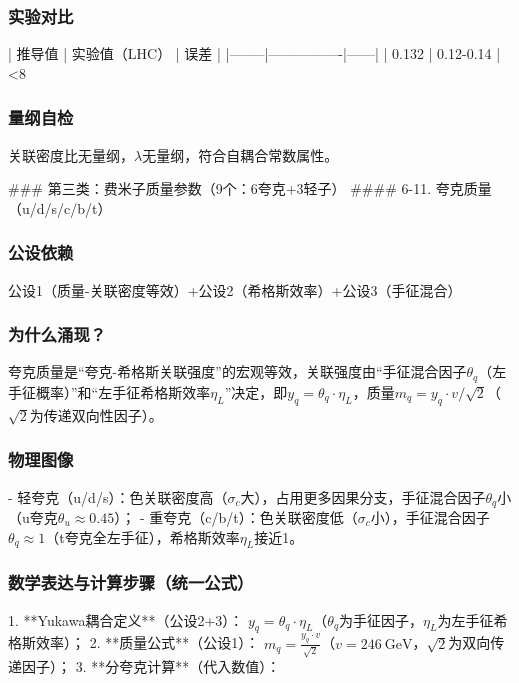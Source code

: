 \documentclass{article}
\begin{document}
\subsubsection{实验对比}
| 推导值 | 实验值（LHC） | 误差 |
|--------|----------------|------|
| 0.132 | 0.12-0.14 | <8%

\subsubsection{量纲自检}
关联密度比无量纲，\(\lambda\)无量纲，符合自耦合常数属性。


### 第三类：费米子质量参数（9个：6夸克+3轻子）
#### 6-11. 夸克质量（u/d/s/c/b/t）
\subsubsection{公设依赖}
公设1（质量-关联密度等效）+公设2（希格斯效率）+公设3（手征混合）

\subsubsection{为什么涌现？}
夸克质量是“夸克-希格斯关联强度”的宏观等效，关联强度由“手征混合因子\(\theta_q\)（左手征概率）”和“左手征希格斯效率\(\eta_L\)”决定，即\(y_q = \theta_q·\eta_L\)，质量\(m_q = y_q·v/\sqrt{2}\)（\(\sqrt{2}\)为传递双向性因子）。

\subsubsection{物理图像}
- 轻夸克（u/d/s）：色关联密度高（\(\sigma_c\)大），占用更多因果分支，手征混合因子\(\theta_q\)小（u夸克\(\theta_u≈0.45\)）；  
- 重夸克（c/b/t）：色关联密度低（\(\sigma_c\)小），手征混合因子\(\theta_q≈1\)（t夸克全左手征），希格斯效率\(\eta_L\)接近1。

\subsubsection{数学表达与计算步骤（统一公式）}
1. **Yukawa耦合定义**（公设2+3）：  
   \(y_q = \theta_q·\eta_L\)（\(\theta_q\)为手征因子，\(\eta_L\)为左手征希格斯效率）；  
2. **质量公式**（公设1）：  
   \(m_q = \frac{y_q·v}{\sqrt{2}}\)（\(v=246\ \text{GeV}\)，\(\sqrt{2}\)为双向传递因子）；  
3. **分夸克计算**（代入数值）：
\end{document}
